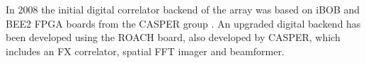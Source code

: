 \documentclass[useAMS,macros,usenatbib,onecolumn]{mn2e}
\begin{document}
In 2008 the initial digital correlator backend of the array was based on iBOB and BEE2 FPGA boards from the CASPER group \citep{best2-casper}.
An upgraded digital backend has been developed using the ROACH board, also developed by CASPER, which includes an FX correlator, spatial FFT imager and beamformer.
\end{document}
